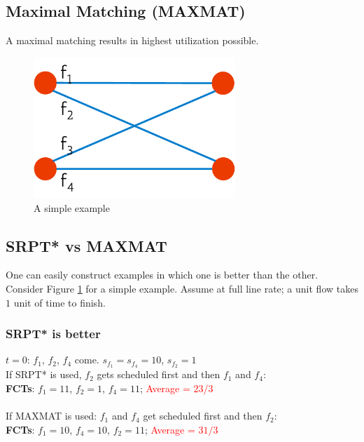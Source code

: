 \documentclass[12pt]{article}
\begin{document}
\subsection{Maximal Matching (MAXMAT)}
A maximal matching results in highest utilization possible. 


\begin{figure}[ht!]
   \centering
   \includegraphics[width=3in]{Figures/SrptVsMaxMat.pdf}
   \caption{A simple example}
   \label{fig:fig1}
 \end{figure}

\subsection{SRPT* vs MAXMAT}
One can easily construct examples in which one is better than the other. Consider Figure \ref{fig:fig1} for a simple example. Assume at full line rate; a unit flow takes $1$ unit of time to finish. 



\subsubsection{SRPT* is better}
$t = 0$: $f_1$, $f_2$, $f_4$ come. $s_{f_1} = s_{f_4} = 10$, $s_{f_2} = 1$\\
If SRPT* is used, $f_2$ gets scheduled first and then $f_1$ and $f_4$: \\
\textbf{FCTs}: $f_1 = 11$, $f_2 = 1$, $f_4 = 11$; \textcolor{red}{Average = $23/3$}\\
\\
If MAXMAT is used: $f_1$ and $f_4$ get scheduled first and then $f_2$: \\
\textbf{FCTs}: $f_1 = 10$, $f_4 = 10$, $f_2 = 11$; \textcolor{red}{Average = $31/3$} 
\end{document}
